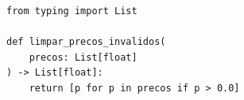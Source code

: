 \ifmostrarGabarito
\begin{verbatim}
from typing import List

def limpar_precos_invalidos(
    precos: List[float]
) -> List[float]:
    return [p for p in precos if p > 0.0]
\end{verbatim}

\fi
